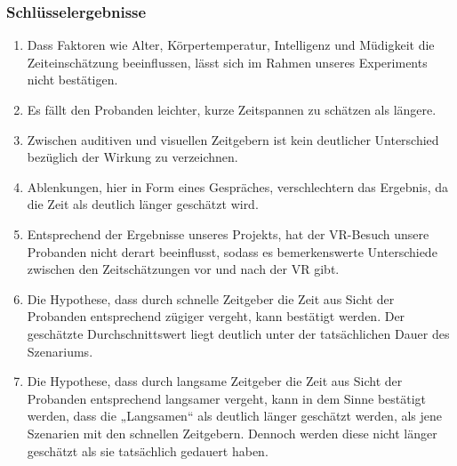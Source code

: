 \documentclass{Bericht}
\begin{document}
\subsubsection{Schlüsselergebnisse}
\begin{enumerate}
\item Dass Faktoren wie Alter, Körpertemperatur, Intelligenz und Müdigkeit die Zeiteinschätzung beeinflussen, lässt sich im Rahmen unseres Experiments nicht bestätigen.


\item Es fällt den Probanden leichter, kurze Zeitspannen zu schätzen als längere.
\item Zwischen auditiven und visuellen Zeitgebern ist kein deutlicher Unterschied bezüglich der Wirkung zu verzeichnen.
\item Ablenkungen, hier in Form eines Gespräches, verschlechtern das Ergebnis, da die Zeit als deutlich länger geschätzt wird. 
\item Entsprechend der Ergebnisse unseres Projekts, hat der VR-Besuch unsere Probanden nicht derart beeinflusst, sodass es bemerkenswerte Unterschiede zwischen den Zeitschätzungen vor und nach der VR gibt.
\item Die Hypothese, dass durch schnelle Zeitgeber die Zeit aus Sicht der Probanden entsprechend zügiger vergeht, kann bestätigt werden. Der geschätzte Durchschnittswert liegt  deutlich unter der tatsächlichen Dauer des Szenariums.
\item Die Hypothese, dass durch langsame Zeitgeber die Zeit aus Sicht der Probanden entsprechend langsamer vergeht, kann in dem Sinne bestätigt werden, dass die „Langsamen“ als deutlich länger geschätzt werden, als jene Szenarien mit den schnellen Zeitgebern. Dennoch werden diese nicht länger geschätzt als sie tatsächlich gedauert haben.
\end{enumerate}
\end{document}
